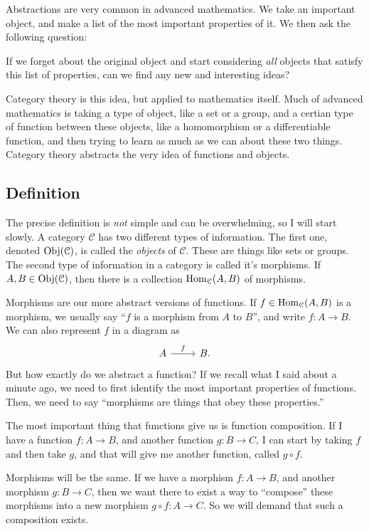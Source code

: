 \documentclass[11pt, letterpaper]{article}
\begin{document}
Abstractions are very common in advanced mathematics. We take an important object, and make a list of the most important properties of it. We then ask the following question:
\begin{displayquote}
	If we forget about the original object and start considering \emph{all} objects that satisfy this list of properties, can we find any new and interesting ideas?
\end{displayquote}
Category theory is this idea, but applied to mathematics itself. Much of advanced mathematics is taking a type of object, like a set or a group, and a certian type of function between these objects, like a homomorphism or a differentiable function, and then trying to learn as much as we can about these two things. Category theory abstracts the very idea of functions and objects.

\subsection{Definition}

The precise definition is \emph{not} simple and can be overwhelming, so I will start slowly. A category $\mathcal{C} $ has two different types of information. The first one, denoted $\operatorname{Obj}(\mathcal{C} ) $, is called the \emph{objects} of $\mathcal{C} $. These are things like sets or groups. The second type of information in a category is called it's morphisms. If $A,B\in \operatorname{Obj}(\mathcal{C} ) $, then there is a collection $\operatorname{Hom}_{\mathcal{C} }(A, B) $ of morphisms.

Morphisms are our more abstract versions of functions. If $f\in \operatorname{Hom}_{\mathcal{C} }(A, B) $ is a morphism, we usually say ``$f$ is a morphism from $A$ to $B$'', and write $f : A \to B$. We can also represent $f$ in a diagram as
\[\begin{tikzcd}[row sep = 2.5em, column sep = 2.5em]
	A\ar[r, "f"]&B.
\end{tikzcd}\]
But how exactly do we abstract a function? If we recall what I said about a minute ago, we need to first identify the most important properties of functions. Then, we need to say ``morphisms are things that obey these properties.''

The most important thing that functions give us is function composition. If I have a function $f : A \to B$, and another function $g : B \to C$, I can start by taking $f$ and then take $g$, and that will give me another function, called $g\circ f$.

Morphisms will be the same. If we have a morphism $f : A \to B$, and another morphism $g : B \to C$, then we want there to exist a way to ``compose'' these morphisms into a new morphism $g\circ f : A \to C$. So we will demand that such a composition exists.
\end{document}
